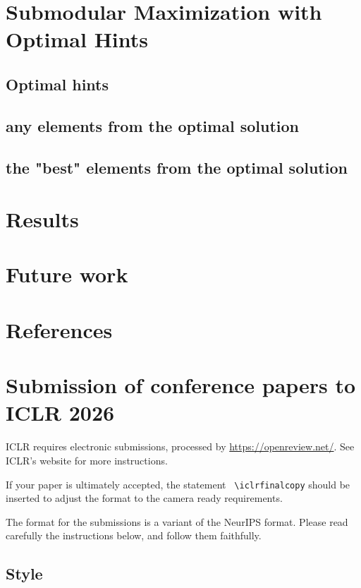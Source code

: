 \documentclass{article} %
\begin{document}
\section{Submodular Maximization with Optimal Hints}

\subsection{Optimal hints}

\subsection{any elements from the optimal solution}

\subsection{the "best" elements from the optimal solution}

\section{Results}



\section{Future work}

\section{References}

\section{Submission of conference papers to ICLR 2026}

ICLR requires electronic submissions, processed by
\url{https://openreview.net/}. See ICLR's website for more instructions.

If your paper is ultimately accepted, the statement {\tt
  {\textbackslash}iclrfinalcopy} should be inserted to adjust the
format to the camera ready requirements.

The format for the submissions is a variant of the NeurIPS format.
Please read carefully the instructions below, and follow them
faithfully.

\subsection{Style}
\end{document}
